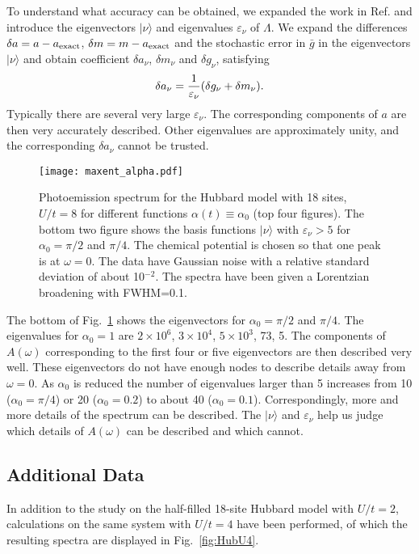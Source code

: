 To understand what accuracy can be obtained, we expanded the work in Ref.  and introduce the eigenvectors $|\nu\rangle$ 
and eigenvalues $\varepsilon_{\nu}$ of $\Lambda$. We expand the differences $\delta a=a-a_{\rm exact}$,  $\delta m=m-a_{\rm exact}$
and the stochastic error in $\bar g$ in the eigenvectors $|\nu\rangle$ and obtain coefficient $\delta a_{\nu}$, $\delta m_{\nu}$
and $\delta g_{\nu}$, satisfying    
\begin{equation}\label{eq:maxent11}
\delta a_{\nu}={1\over \varepsilon_{\nu}}(\delta g_{\nu}+\delta m_{\nu}).
\end{equation}
Typically there are several very large $\varepsilon_{\nu}$.
The corresponding components of $a$ are then very accurately described. Other eigenvalues 
are approximately unity, and the corresponding $\delta a_{\nu}$ cannot be
trusted.                        

\begin{figure}[t!]
\texttt{[image: maxent\_alpha.pdf]}
\caption{Photoemission spectrum for the Hubbard model with 18 sites, $U/t=8$ for different functions $\alpha(t)\equiv \alpha_0$ (top four figures).
The bottom two figure shows the  basis functions $|\nu\rangle$ with 
$\varepsilon_{\nu}>5$ for $\alpha_0=\pi/2$ and $\pi/4$.
The chemical potential is chosen so that one peak is at $\omega=0$.
The data have Gaussian noise with a relative standard deviation 
of about 10$^{-2}$. The spectra have been given a Lorentzian broadening 
with FWHM=0.1.
}
\label{fig:maxent}
\end{figure}


The bottom of Fig.~\ref{fig:maxent} shows the eigenvectors for $\alpha_0=\pi/2$ and $\pi/4$. 
The eigenvalues for $\alpha_0=1$ are $2\times 10^6$, $3 \times 10^4$, $5 \times 10^3$, 73, 5.   
The components of $A(\omega)$ corresponding to the first four or five eigenvectors are then described very well.
These eigenvectors do not have enough nodes to describe details away from $\omega=0$. As $\alpha_0$ is reduced 
the number of eigenvalues larger than 5 increases from 10 ($\alpha_0=\pi/4$) or 20 ($\alpha_0=0.2$) to about 40 ($\alpha_0=0.1$).
Correspondingly, more and more details of the spectrum can be described.
The $|\nu\rangle$ and $\varepsilon_{\nu}$ help  us judge which details of $A(\omega)$ can be described
and which cannot. 

\subsection{Additional Data}
In addition to the study on the half-filled 18-site Hubbard model with
$U/t=2$, calculations on the same system with $U/t=4$ have been performed, of
which the resulting spectra are displayed in Fig.~\ref{fig:HubU4}.

